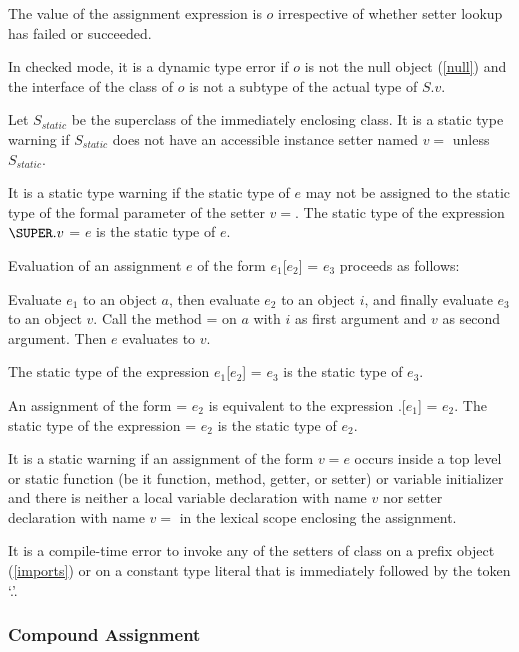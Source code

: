 \documentclass{article}
\newcommand{\code}[1]{{\sf #1}}
\begin{document}
\LMHash{}
The value of the assignment expression is $o$ irrespective of whether setter lookup has failed or succeeded.

\LMHash{}
In checked mode, it is a dynamic type error if $o$ is not the null object (\ref{null}) and the interface of the class of $o$ is not a subtype of the actual type of $S.v$.

\LMHash{}
Let $S_{static}$ be the superclass of the immediately enclosing class. It is a static type warning if $S_{static}$ does not have an accessible instance setter named $v=$ unless $S_{static}$.

\LMHash{}
It is a static type warning if the static type of $e$ may not be assigned to the static type of the formal parameter of the setter $v=$.   The static type of the expression $\SUPER.v$ \code{=} $e$ is the static type of $e$.

\LMHash{}
Evaluation of an assignment $e$ of the form \code{$e_1$[$e_2$] = $e_3$}
proceeds as follows:

\LMHash{}
Evaluate $e_1$ to an object $a$, then evaluate $e_2$ to an object $i$, and finally evaluate $e_3$ to an object $v$.
Call the method \code{[]=} on $a$ with $i$ as first argument and $v$ as second argument.
Then $e$ evaluates to $v$.

\LMHash{}
The static type of the expression \code{$e_1$[$e_2$] = $e_3$} is the static type of $e_3$.

\LMHash{}
An assignment of the form \code{\SUPER[$e_1$] = $e_2$} is equivalent to the expression \code{\SUPER.[$e_1$] = $e_2$}.  The static type of the expression \code{\SUPER[$e_1$] = $e_2$} is the static type of $e_2$.



\LMHash{}
It is a static warning if an assignment of the form $v = e$ occurs inside a top level or static function (be it function, method, getter, or setter) or variable initializer and there is neither a local variable declaration with name $v$  nor setter declaration with name $v=$ in the lexical scope enclosing the assignment.

\LMHash{}
It is a compile-time error to invoke any of the setters of class  on a prefix object (\ref{imports}) or on a constant type literal that is  immediately followed by the token `.'.



\subsubsection{Compound Assignment}
\end{document}
